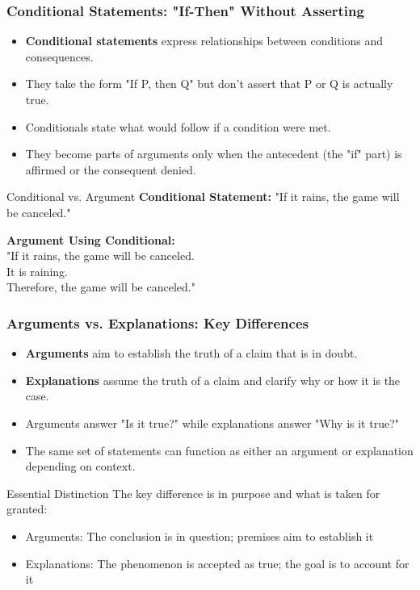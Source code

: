 \documentclass{beamer}
\begin{document}
\begin{frame}
    \frametitle{Conditional Statements: "If-Then" Without Asserting}
    \begin{itemize}
        \item \textbf{Conditional statements} express relationships between conditions and consequences.
        \item They take the form "If P, then Q" but don't assert that P or Q is actually true.
        \item Conditionals state what would follow if a condition were met.
        \item They become parts of arguments only when the antecedent (the "if" part) is affirmed or the consequent denied.
    \end{itemize}
    
    \begin{exampleblock}{Conditional vs. Argument}
        \textbf{Conditional Statement:} "If it rains, the game will be canceled."
        
        \textbf{Argument Using Conditional:}\\
        "If it rains, the game will be canceled.\\
        It is raining.\\
        Therefore, the game will be canceled."
    \end{exampleblock}
\end{frame}

\begin{frame}
    \frametitle{Arguments vs. Explanations: Key Differences}
    \begin{itemize}
        \item \textbf{Arguments} aim to establish the truth of a claim that is in doubt.
        \item \textbf{Explanations} assume the truth of a claim and clarify why or how it is the case.
        \item Arguments answer "Is it true?" while explanations answer "Why is it true?"
        \item The same set of statements can function as either an argument or explanation depending on context.
    \end{itemize}
    
    \begin{alertblock}{Essential Distinction}
        The key difference is in purpose and what is taken for granted:
        \begin{itemize}
            \item Arguments: The conclusion is in question; premises aim to establish it
            \item Explanations: The phenomenon is accepted as true; the goal is to account for it
        \end{itemize}
    \end{alertblock}
\end{frame}
\end{document}
